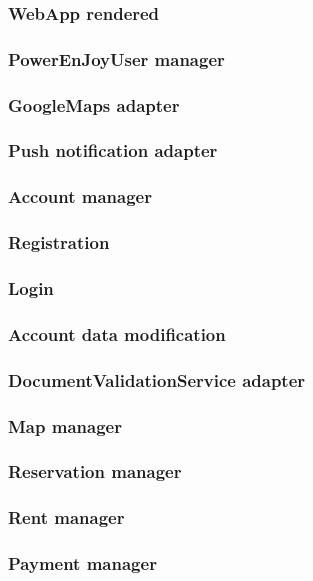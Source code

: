 \documentclass[english]{article}
\begin{document}
		\subsubsection{WebApp rendered}
	\subsubsection{PowerEnJoyUser manager}
	\subsubsection{GoogleMaps adapter}
	\subsubsection{Push notification adapter}
	
	\subsubsection{Account manager}
		\subsubsection{Registration }
		\subsubsection{Login}
		\subsubsection{Account data modification }
	\subsubsection{DocumentValidationService adapter}
	
	\subsubsection{Map manager}
	\subsubsection{Reservation manager}
	\subsubsection{Rent manager}
	
	\subsubsection{Payment manager}
\end{document}
